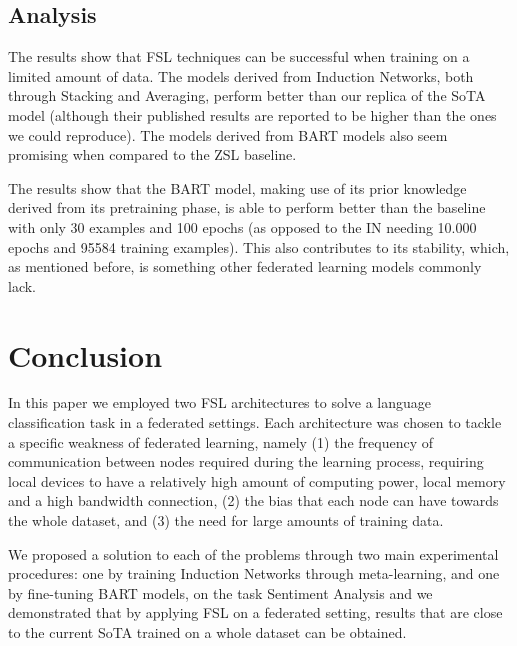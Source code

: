 \documentclass{esannV2}
\begin{document}
    
    \subsection{Analysis}
    The results show that FSL techniques can be successful when training on a limited amount of data. The models derived from Induction Networks, both through Stacking and Averaging, perform better than our replica of the SoTA model (although their published results are reported to be higher than the ones we could reproduce). The models derived from BART models also seem promising when compared to the ZSL baseline.
    
    The results show that the BART model, making use of its prior knowledge derived from its pretraining phase, is able to perform better than the baseline with only 30 examples and 100 epochs (as opposed to the IN needing 10.000 epochs and 95584 training examples). This also contributes to its stability, which, as mentioned before, is something other federated learning models commonly lack.
    


    \section{Conclusion}
    In this paper we employed two FSL architectures to solve a language classification task in a federated settings. Each architecture was chosen to tackle a specific weakness of federated learning, namely (1) the frequency of communication between nodes required during the learning process, requiring local devices to have a relatively high amount of computing power, local memory and a high bandwidth connection, (2) the bias that each node can have towards the whole dataset, and (3) the need for large amounts of training data.
    
    We proposed a solution to each of the problems through two main experimental procedures: one by training Induction Networks through meta-learning, and one by fine-tuning BART models, on the task Sentiment Analysis and we demonstrated that by applying FSL on a federated setting, results that are close to the current SoTA trained on a whole dataset can be obtained. 


\begin{footnotesize}




\end{footnotesize}

%
\end{document}
